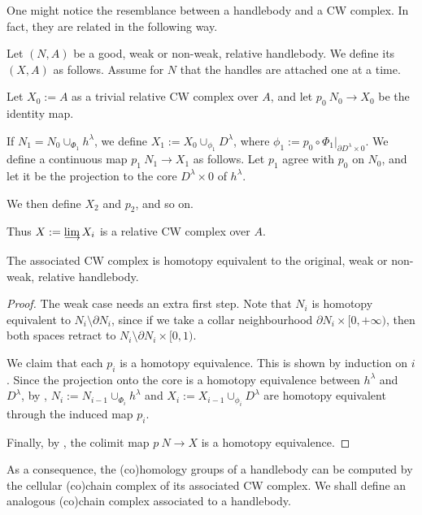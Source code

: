 One might notice the resemblance between a handlebody and a CW complex.
In fact, they are related in the following way.

\begin{definition}
Let $(N,A)$ be a good, weak or non-weak, relative handlebody.
We define its  $(X,A)$ as follows.
Assume for $N$ that the handles are attached one at a time.
\begin{itms}
\item Let $X_0:=A$ as a trivial relative CW complex over $A$,
and let $p_0\:N_0\to X_0$ be the identity map.
\item If $N_1=N_0\cup_{\Phi_1}h^\lambda$,
we define $X_1:=X_0\cup_{\phi_1}D^\lambda$,
where $\phi_1:=p_0\circ\Phi_1|_{\partial D^\lambda\times 0}$.
We define a continuous map $p_1\:N_1\to X_1$ as follows.
Let $p_1$ agree with $p_0$ on $N_0$,
and let it be the projection to the core $D^\lambda\times0$ of $h^\lambda$.
\item We then define $X_2$ and $p_2$, and so on. 
\end{itms}
Thus $X:=\limdct X_i$ is a relative CW complex over $A$. \varqed
\end{definition}

\begin{proposition}\label{prop:ass-cw}
The associated CW complex is homotopy equivalent to the original, weak or non-weak, relative handlebody.
\end{proposition}

\begin{proof}
The weak case needs an extra first step. Note that $N_i$ is homotopy equivalent to $N_i\setminus\partial N_i$,
since if we take a collar neighbourhood $\partial N_i\times[0,+\infty)$,
then both spaces retract to $N_i\setminus\partial N_i\times[0,1)$.

We claim that each $p_i$ is a homotopy equivalence.
This is shown by induction on $i$. Since the projection onto the core is a homotopy equivalence
between $h^\lambda$ and $D^\lambda$, by \cite[Lemma~2.1.3]{may},
$N_i:=N_{i-1}\cup_{\Phi_i}h^\lambda$ and $X_i:=X_{i-1}\cup_{\phi_i}D^\lambda$
are homotopy equivalent through the induced map $p_i$.

Finally, by \cite[Lemma~2.1.10]{may}, the colimit map $p\:N\to X$ is a homotopy equivalence.
\end{proof}

As a consequence,
the (co)homology groups of a handlebody 
can be computed by the cellular (co)chain complex of 
its associated CW complex.
We shall define an analogous (co)chain complex associated to a handlebody.

